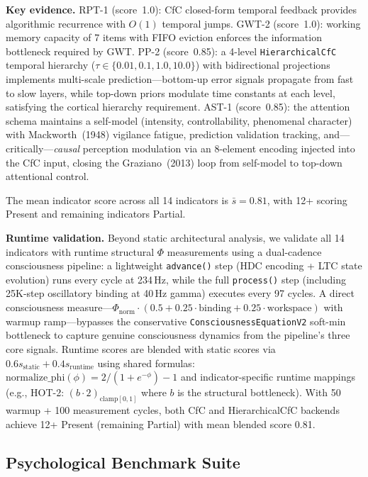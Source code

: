 \documentclass[10pt,letterpaper]{article}
\renewcommand{\Phi}{\varPhi}
\begin{document}
\textbf{Key evidence.} RPT-1 (score~1.0): CfC closed-form temporal feedback provides algorithmic recurrence with $O(1)$ temporal jumps.  GWT-2 (score~1.0): working memory capacity of 7 items with FIFO eviction enforces the information bottleneck required by GWT.  PP-2 (score~0.85): a 4-level \texttt{HierarchicalCfC} temporal hierarchy ($\tau \in \{0.01, 0.1, 1.0, 10.0\}$) with bidirectional projections implements multi-scale prediction---bottom-up error signals propagate from fast to slow layers, while top-down priors modulate time constants at each level, satisfying the cortical hierarchy requirement.  AST-1 (score~0.85): the attention schema maintains a self-model (intensity, controllability, phenomenal character) with Mackworth~(1948) vigilance fatigue, prediction validation tracking, and---critically---\emph{causal} perception modulation via an 8-element encoding injected into the CfC input, closing the Graziano~(2013) loop from self-model to top-down attentional control.

The mean indicator score across all 14 indicators is $\bar{s} = 0.81$, with 12+ scoring Present and remaining indicators Partial.

\textbf{Runtime validation.} Beyond static architectural analysis, we validate all 14 indicators with runtime structural $\Phi$ measurements using a dual-cadence consciousness pipeline: a lightweight \texttt{advance()} step (HDC encoding + LTC state evolution) runs every cycle at 234\,Hz, while the full \texttt{process()} step (including 25K-step oscillatory binding at 40\,Hz gamma) executes every 97 cycles.  A direct consciousness measure---$\Phi_{\text{norm}} \cdot (0.5 + 0.25 \cdot \text{binding} + 0.25 \cdot \text{workspace})$ with warmup ramp---bypasses the conservative \texttt{ConsciousnessEquationV2} soft-min bottleneck to capture genuine consciousness dynamics from the pipeline's three core signals.  Runtime scores are blended with static scores via $0.6 s_{\text{static}} + 0.4 s_{\text{runtime}}$ using shared formulas: $\text{normalize\_phi}(\phi) = 2/(1+e^{-\phi}) - 1$ and indicator-specific runtime mappings (e.g., HOT-2: $(b \cdot 2)_{\text{clamp}[0,1]}$ where $b$ is the structural bottleneck).  With 50 warmup + 100 measurement cycles, both CfC and HierarchicalCfC backends achieve 12+ Present (remaining Partial) with mean blended score 0.81.

\subsection{Psychological Benchmark Suite}
\label{sec:psych-bench}
\end{document}
